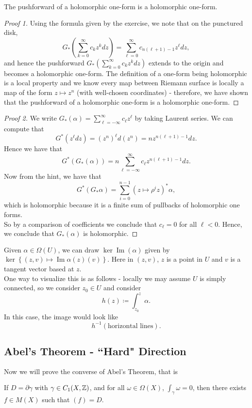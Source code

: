 \documentclass{article}
\begin{document}
{\begin{lemma}
    The pushforward of a holomorphic one-form is a holomorphic one-form.
\end{lemma}

\begin{proof}[Proof 1]
   Using the formula given by the exercise, we note that on the punctured disk,
   \[G_*(\sum_{k = 0}^\infty c_k z^k dz) = \sum_{\ell = 0}^\infty c_{n(\ell + 1) - 1} z^\ell dz,\]
   and hence the pushforward $G_*(\sum_{k = 0}^\infty c_k z^k dz)$ extends to the origin and becomes a holomorphic one-form. The definition of a one-form being holomorphic is a local property and we know every map between Riemann surface is locally a map of the form $z \mapsto z^n$ (with well-chosen coordinates) - therefore, we have shown that the pushforward of a holomorphic one-form is a holomorphic one-form.
\end{proof}

\begin{proof}[Proof 2]
   We write $G_*(\alpha) = \sum_{\ell = -\infty}^\infty c_\ell z^\ell$ by taking Laurent series. We can compute that
    \[G^*(z^\ell dz) = (z^n)^{\ell} d(z^n) = n z^{n(\ell + 1) - 1} dz.\]
    Hence we have that
    \[G^*(G_*(\alpha)) = n \sum_{\ell =-\infty}^\infty c_\ell z^{n(\ell + 1) - 1} dz.\]
    Now from the hint, we have that
    $$G^*(G_* \alpha) = \sum_{i = 0}^{n-1} (z \mapsto \rho^i z)^* \alpha,$$
    which is holomorphic because it is a finite sum of pullbacks of holomorphic one forms.\\
    
    So by a comparison of coefficients we conclude that $c_\ell = 0$ for all $\ell < 0$. Hence, we conclude that $G_*(\alpha)$ is holomorphic.
\end{proof}

\begin{remark}
    Given $\alpha \in \Omega(U)$, we can draw $\ker \operatorname{Im}(\alpha)$ given by $\ker \left\{ (z, v) \mapsto \operatorname{Im} \alpha(z)(v) \right\}$. Here in $(z, v)$, $z$ is a point in $U$ and $v$ is a tangent vector based at $z$.\\

    One way to visualize this is as follows - locally we may assume $U$ is simply connected, so we consider $z_0 \in U$ and consider
    \[h(z) \coloneqq \int_{z_0}^z \alpha.\]
    In this case, the image would look like
    \[h^{-1}(\text{horizontal lines}).\]
\end{remark}

\subsection{Abel's Theorem - ``Hard" Direction}
Now we will prove the converse of Abel's Theorem, that is
\begin{theorem}
    If $D = \partial \gamma$ with $\gamma \in C_1(X, \mathbb{Z})$, and for all $\omega \in \Omega(X)$, $\int_\gamma \omega = 0$, then there exists $f \in M(X)$ such that $(f) = D$.
\end{theorem}

}
\end{document}
